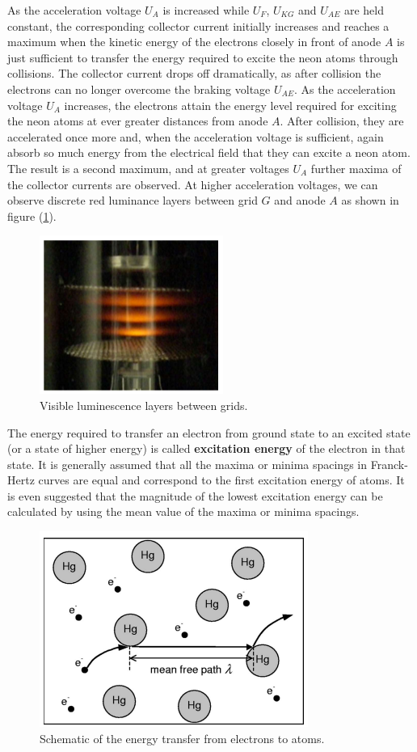 \documentclass[%
 reprint,
 amsmath,amssymb,
 aps,
]{revtex4-2}
\begin{document}
    As the acceleration voltage $U_A$ is increased while $U_F$, $U_{KG}$ and $U_{AE}$ are held constant, the corresponding collector current initially increases and reaches a maximum when the kinetic energy of the electrons closely in front of anode $A$ is just sufficient to transfer the energy required to excite the neon atoms through collisions. The collector current drops off dramatically, as after collision the electrons can no longer overcome the braking voltage $U_{AE}$. As the acceleration voltage $U_A$ increases, the electrons attain the energy level required for exciting the neon atoms at ever greater distances from anode $A$. After collision, they are accelerated once more and, when the acceleration voltage is sufficient, again absorb so much energy from the electrical field that they can excite a neon atom. The result is a second maximum, and at greater voltages $U_A$ further maxima of the collector currents are observed. At higher acceleration voltages, we can observe discrete red luminance layers between grid $G$ and anode $A$ as shown in figure (\ref{fig:layers}).
    \begin{figure}[h]
        \centering
        \includegraphics{Figures/layers.png}
        \caption{Visible luminescence layers between grids.}
        \label{fig:layers}
    \end{figure}
    \par
    The energy required to transfer an electron from ground state to an excited state (or a state of higher energy) is called \textbf{excitation energy} of the electron in that state. It is generally assumed that all the maxima or minima spacings in Franck-Hertz curves are equal and correspond to the first excitation energy of atoms. It is even suggested that the magnitude of the lowest excitation energy can be calculated by using the mean value of the maxima or minima spacings.
    \begin{figure}
        \centering
        \includegraphics[scale = 0.9]{Figures/meanfree.png}
        \caption{Schematic of the energy transfer from electrons to atoms.}
        \label{fig:meanFreePath}
    \end{figure}
\end{document}
